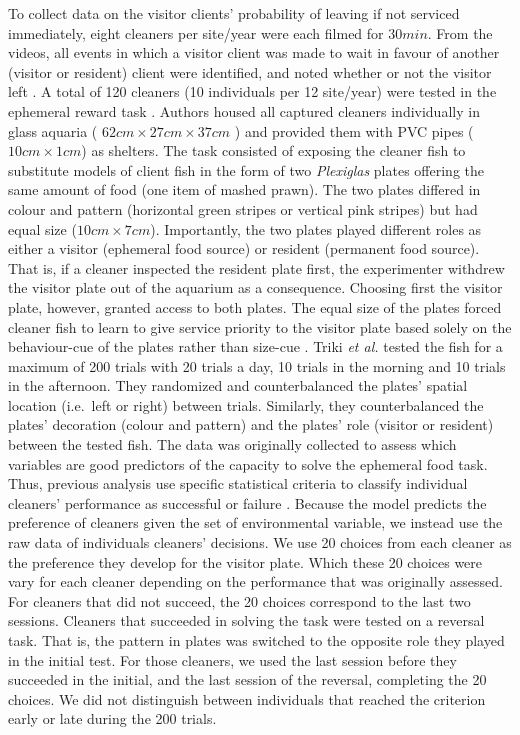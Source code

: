 \documentclass[]{rsos}%
\begin{document}
To collect data on the visitor clients' probability of leaving if not serviced
immediately, eight cleaners per site/year were each filmed for \(30 min\).
From the videos, all events in which a visitor client was made to wait in
favour of another (visitor or resident) client were identified, and noted
whether or not the visitor left \citep{triki_Biological_2019, triki_Brain_2020}.
A total of 120 cleaners (10 individuals per 12 site/year) were tested in the
ephemeral reward task \citep{triki_Biological_2019, triki_Brain_2020}. Authors
housed all captured cleaners individually in glass aquaria
( \(62cm \times 27cm \times 37 cm\) ) and provided them
with PVC pipes (\(10 cm \times 1 cm\)) as shelters.
The task consisted of exposing the cleaner fish to substitute
models of client fish in the form of two \emph{Plexiglas} plates offering the
same amount of food (one item of mashed prawn). The two plates differed
in colour and pattern (horizontal green stripes or vertical pink stripes)
but had equal size (\(10 cm \times 7 cm\)). Importantly, the two plates played
different roles as either a visitor (ephemeral food source) or
resident (permanent food source). That is, if a cleaner inspected the
resident plate first, the experimenter withdrew the visitor plate out of
the aquarium as a consequence. Choosing first the visitor plate,
however, granted access to both plates. The equal size of the plates
forced cleaner fish to learn to give service priority to the visitor plate
based solely on the behaviour-cue of the plates rather than size-cue
\citep{wismer_Cuebased_2019}. Triki \emph{et al.} \citep{triki_Biological_2019, triki_Brain_2020}
tested the fish for a maximum of 200 trials with 20 trials a day, 10 trials
in the morning and 10 trials in the afternoon. They randomized and
counterbalanced the plates' spatial location (i.e.~left or right)
between trials. Similarly, they counterbalanced the plates' decoration
(colour and pattern) and the plates' role (visitor or resident) between the
tested fish. The data was originally collected to assess which variables are
good predictors of the capacity to solve the ephemeral food task. Thus, previous
analysis use specific statistical criteria to classify individual cleaners'
performance as successful or failure \citep{triki_Biological_2019}. Because the model
predicts the preference of cleaners given the set of environmental variable,
we instead use the raw data of individuals cleaners' decisions.
We use 20 choices from each cleaner as the preference they develop
for the visitor plate. Which these 20 choices were vary for each cleaner depending
on the performance that was originally assessed. For cleaners that did not
succeed, the 20 choices correspond to the last two sessions. Cleaners that
succeeded in solving the task were tested on a reversal task. That is, the
pattern in plates was switched to the opposite role they played in the
initial test. For those cleaners, we used the last session before they succeeded
in the initial, and the last session of the reversal, completing the 20 choices.
We did not distinguish between individuals that reached the criterion early
or late during the 200 trials.
\end{document}

